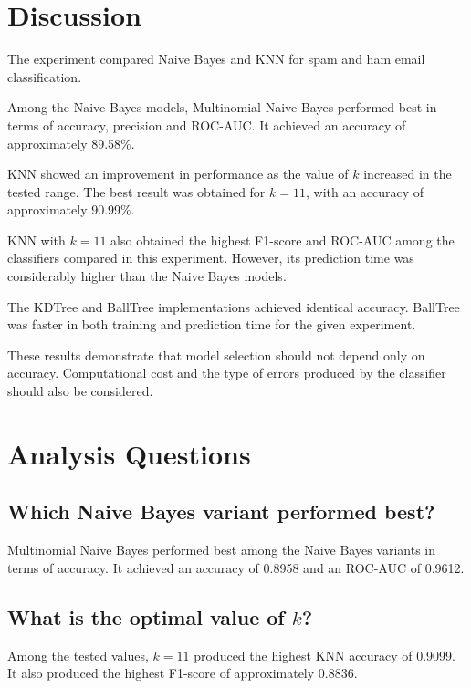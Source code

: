 \documentclass[12pt,a4paper]{article}
\begin{document}
\section{Discussion}

The experiment compared Naive Bayes and KNN for spam and ham email classification.

Among the Naive Bayes models, Multinomial Naive Bayes performed best in terms of accuracy, precision and ROC-AUC. It achieved an accuracy of approximately 89.58\%.

KNN showed an improvement in performance as the value of $k$ increased in the tested range. The best result was obtained for $k=11$, with an accuracy of approximately 90.99\%.

KNN with $k=11$ also obtained the highest F1-score and ROC-AUC among the classifiers compared in this experiment. However, its prediction time was considerably higher than the Naive Bayes models.

The KDTree and BallTree implementations achieved identical accuracy. BallTree was faster in both training and prediction time for the given experiment.

These results demonstrate that model selection should not depend only on accuracy. Computational cost and the type of errors produced by the classifier should also be considered.


\section{Analysis Questions}

\subsection{Which Naive Bayes variant performed best?}

Multinomial Naive Bayes performed best among the Naive Bayes variants in terms of accuracy. It achieved an accuracy of 0.8958 and an ROC-AUC of 0.9612.

\subsection{What is the optimal value of $k$?}

Among the tested values, $k=11$ produced the highest KNN accuracy of 0.9099. It also produced the highest F1-score of approximately 0.8836.
\end{document}
